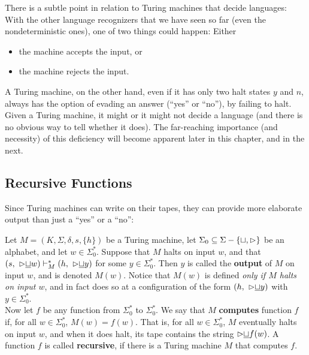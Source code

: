 There is a subtle point in relation to Turing machines that decide languages: With the other language recognizers that we have seen so far (even the nondeterministic ones), one of two things could happen: Either
\begin{itemize}
  \item the machine accepts the input, or 
  \item the machine rejects the input.
\end{itemize}
A Turing machine, on the other hand, even if it has only two halt states $y$ and $n$, always has the option of evading an answer (``yes'' or ``no''), by failing to halt. Given a Turing machine, it might or it might not decide a language (and there is no obvious way to tell whether it does). The far-reaching importance (and necessity) of this deficiency will become apparent later in this chapter, and in the next.

\vspace*{\fill}
\columnbreak

\subsection{Recursive Functions}

Since Turing machines can write on their tapes, they can provide more elaborate output than just a ``yes'' or a ``no'':
\begin{definition}{}
Let $M = (K, \Sigma, \delta, s, \{h\})$ be a Turing machine, let $\Sigma_0 \subseteq \Sigma - \{ \sqcup, \vartriangleright \}$ be an alphabet, and let $w \in \Sigma_0^*$. Suppose that $M$ halts on input $w$, and that $(s,\ {\vartriangleright}{\underline{\sqcup}}w) \vdash_M^* (h,\ {\vartriangleright}{\underline{\sqcup}}y)$ for some $y \in \Sigma_0^*$. Then $y$ is called the \textbf{output} of $M$ on input $w$, and is denoted $M(w)$. Notice that $M(w)$ is defined \textit{only if $M$ halts on input $w$}, and in fact does so at a configuration of the form $(h,\ {\vartriangleright}{\underline{\sqcup}}y)$ with $y \in \Sigma_0^*$. \\

\quad Now let $f$ be any function from $\Sigma_0^*$ to $\Sigma_0^*$. We say that $M$ \textbf{computes} function $f$ if, for all $w \in \Sigma_0^*$, $M(w) = f(w)$. That is, for all $w \in \Sigma_0^*$, $M$ eventually halts on input $w$, and when it does halt, its tape contains the string ${\vartriangleright}{\underline{\sqcup}}f(w)$. A function $f$ is called \textbf{recursive}, if there is a Turing machine $M$ that computes $f$. 
\end{definition}

